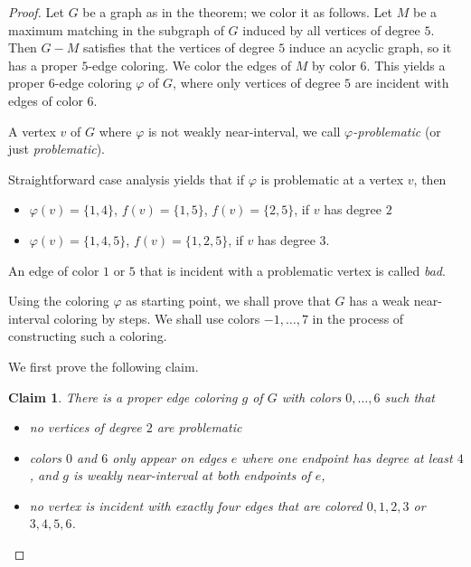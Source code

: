 \documentclass[10pt,a4paper]{amsart}
\newtheorem{claim}{Claim}
\begin{document}
\begin{proof}
	Let $G$ be a graph as in the theorem;
	we color it as follows. Let $M$ be a maximum matching in the subgraph of $G$ induced
	by all vertices of degree $5$. Then $G-M$ satisfies that the vertices of degree $5$ induce
	an acyclic graph, so it has a proper $5$-edge coloring. We color the edges of $M$ by color $6$.
	This yields a proper $6$-edge coloring $\varphi$ of $G$, where only vertices of degree $5$ are incident with
	edges of color $6$.

	A vertex $v$ of $G$ where $\varphi$ is not weakly near-interval, we call {\em $\varphi$-problematic} (or just {\em problematic}).
	
	Straightforward case analysis yields that if $\varphi$ is problematic at a vertex $v$, then
\begin{itemize}

	\item $\varphi(v)=\{1,4\}$, $f(v)=\{1,5\}$, $f(v)=\{2,5\}$, if $v$ has degree $2$

	\item $\varphi(v)=\{1,4,5\}$, $f(v)=\{1,2,5\}$, if $v$ has degree $3$.

\end{itemize}

	An edge of color $1$ or $5$ that is incident with a problematic vertex is called {\em bad}.
	
	Using the coloring $\varphi$ as starting point, we shall prove that $G$ has a weak near-interval
	coloring by steps. We shall use colors $-1, \dots, 7$ in the process of constructing such a coloring.


	We first prove the following claim.

\begin{claim}
\label{cl:prob2}
	There is a proper edge coloring $g$ of $G$ with colors $0, \dots, 6$ such that
\begin{itemize}
	\item[(a)] no vertices of degree $2$ are problematic

	\item[(b)] colors $0$ and $6$ only appear on edges $e$ where one endpoint has degree at least $4$, and $g$
	is weakly near-interval at both endpoints of $e$,

	\item[(c)] no vertex is incident with exactly four edges that are colored $0,1,2,3$ or $3,4,5,6$.
\end{itemize}
\end{claim}


\end{proof}
\end{document}
